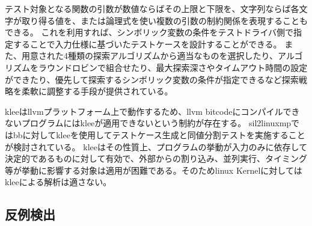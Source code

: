 テスト対象となる関数の引数が数値ならばその上限と下限を、文字列ならば各文字が取り得る値を、または論理式を使い複数の引数の制約関係を表現することもできる。
これを利用すれば、シンボリック変数の条件をテストドライバ側で指定することで入力仕様に基づいたテストケースを設計することができる。
また、用意された4種類の探索アルゴリズムから適当なものを選択したり、アルゴリズムをラウンドロビンで組合せたり、最大探索深さやタイムアウト時間の設定ができたり、優先して探索するシンボリック変数の条件が指定できるなど探索戦略を柔軟に調整する手段が提供されている。
\par
\acrshort{klee}は\acrshort{llvm}プラットフォーム上で動作するため、\acrshort{llvm} bitcodeにコンパイルできないプログラムには\acrshort{klee}が適用できないという制約が存在する。
\acrshort{sil2linuxmp}では\acrshort{bb}に対して\acrshort{klee}を使用してテストケース生成と同値分割テストを実施することが検討されている。
\acrshort{klee}はその性質上、プログラムの挙動が入力のみに依存して決定的であるものに対して有効で、外部からの割り込み、並列実行、タイミング等が挙動に影響する対象は適用が困難である。そのため\acrshort{linux} Kernelに対しては\acrshort{klee}による解析は適さない。
\subsection{反例検出}

